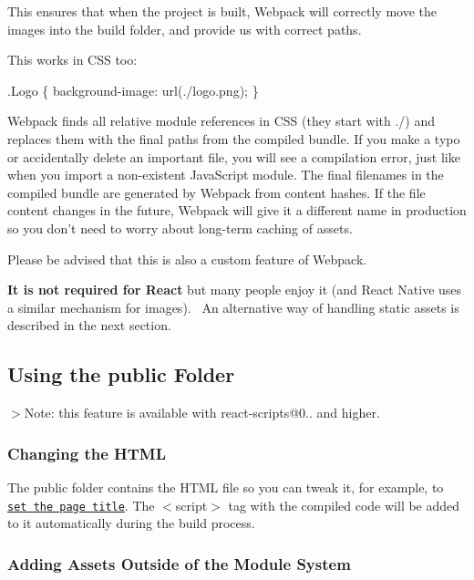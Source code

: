 This ensures that when the project is built, Webpack will correctly move the images into the build folder, and provide us with correct paths.

This works in C\+SS too\+:


\begin{DoxyCode}
.Logo \{
  background-image: url(./logo.png);
\}
\end{DoxyCode}


Webpack finds all relative module references in C\+SS (they start with {\ttfamily ./}) and replaces them with the final paths from the compiled bundle. If you make a typo or accidentally delete an important file, you will see a compilation error, just like when you import a non-\/existent Java\+Script module. The final filenames in the compiled bundle are generated by Webpack from content hashes. If the file content changes in the future, Webpack will give it a different name in production so you don’t need to worry about long-\/term caching of assets.

Please be advised that this is also a custom feature of Webpack.

{\bfseries It is not required for React} but many people enjoy it (and React Native uses a similar mechanism for images).~\newline
 An alternative way of handling static assets is described in the next section.

\subsection*{Using the {\ttfamily public} Folder}

$>$Note\+: this feature is available with {\ttfamily react-\/scripts@0..} and higher.

\subsubsection*{Changing the H\+T\+ML}

The {\ttfamily public} folder contains the H\+T\+ML file so you can tweak it, for example, to \href{#changing-the-page-title}{\tt set the page title}. The {\ttfamily $<$script$>$} tag with the compiled code will be added to it automatically during the build process.

\subsubsection*{Adding Assets Outside of the Module System}

